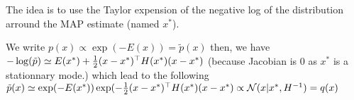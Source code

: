 			The idea is to use the Taylor expension of the negative log of the distribution arround the MAP estimate (named $x^*$).

			We write $p(x) \propto \exp (-E(x)) = \tilde{p}(x)$ 
			then, we have $-\log(\tilde{p}) \simeq E(x^*) + \frac{1}{2}(x-x^*)^\top H(x^*)(x-x^*)$ (because Jacobian is 0 as $x^*$ is a stationnary mode.) which lead to the following $\tilde{p}(x) \simeq \exp (-E(x^*)) \exp (- \frac{1}{2}(x-x^*)^\top H(x^*)(x-x^*) \propto \mathcal{N}(x| x^*, H^{-1} )= q(x)$

